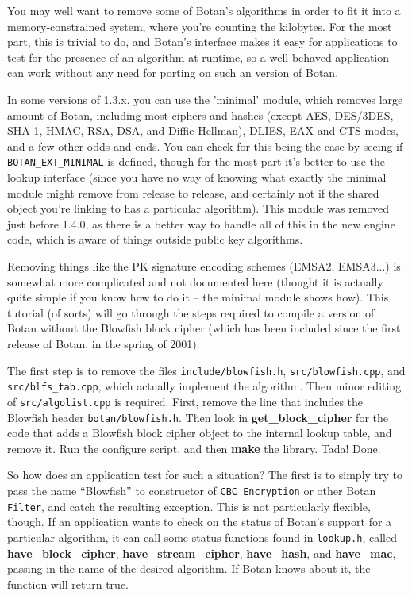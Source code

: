 \documentclass{article}
\newcommand{\filename}[1]{\texttt{#1}}
\newcommand{\macro}[1]{\texttt{#1}}
\newcommand{\function}[1]{\textbf{#1}}
\newcommand{\type}[1]{\texttt{#1}}
\begin{document}
You may well want to remove some of Botan's algorithms in order to fit it into
a memory-constrained system, where you're counting the kilobytes. For the most
part, this is trivial to do, and Botan's interface makes it easy for
applications to test for the presence of an algorithm at runtime, so a
well-behaved application can work without any need for porting on such an
version of Botan.

In some versions of 1.3.x, you can use the 'minimal' module, which removes
large amount of Botan, including most ciphers and hashes (except AES, DES/3DES,
SHA-1, HMAC, RSA, DSA, and Diffie-Hellman), DLIES, EAX and CTS modes, and a few
other odds and ends. You can check for this being the case by seeing if
\macro{BOTAN\_EXT\_MINIMAL} is defined, though for the most part it's better to
use the lookup interface (since you have no way of knowing what exactly the
minimal module might remove from release to release, and certainly not if the
shared object you're linking to has a particular algorithm). This module was
removed just before 1.4.0, as there is a better way to handle all of this in
the new engine code, which is aware of things outside public key algorithms.

Removing things like the PK signature encoding schemes (EMSA2, EMSA3...) is
somewhat more complicated and not documented here (thought it is actually quite
simple if you know how to do it -- the minimal module shows how). This tutorial
(of sorts) will go through the steps required to compile a version of Botan
without the Blowfish block cipher (which has been included since the first
release of Botan, in the spring of 2001).

The first step is to remove the files \filename{include/blowfish.h},
\filename{src/blowfish.cpp}, and \filename{src/blfs\_tab.cpp}, which actually
implement the algorithm. Then minor editing of \filename{src/algolist.cpp} is
required. First, remove the line that includes the Blowfish header
\filename{botan/blowfish.h}. Then look in \function{get\_block\_cipher} for the
code that adds a Blowfish block cipher object to the internal lookup table, and
remove it. Run the configure script, and then \textbf{make} the library. Tada!
Done.

So how does an application test for such a situation? The first is to simply
try to pass the name ``Blowfish'' to constructor of \type{CBC\_Encryption} or
other Botan \type{Filter}, and catch the resulting exception. This is not
particularly flexible, though. If an application wants to check on the status
of Botan's support for a particular algorithm, it can call some status
functions found in \filename{lookup.h}, called \function{have\_block\_cipher},
\function{have\_stream\_cipher}, \function{have\_hash}, and
\function{have\_mac}, passing in the name of the desired algorithm. If Botan
knows about it, the function will return true.
\end{document}
